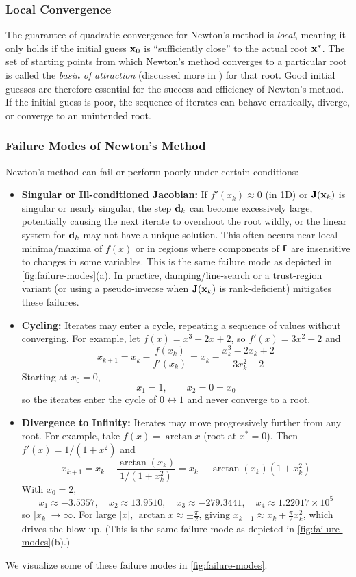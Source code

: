 \subsubsection{Local Convergence}
The guarantee of quadratic convergence for Newton's method is \textit{local}, meaning it only holds if the initial guess $\mathbf{x}_0$ is ``sufficiently close'' to the actual root $\mathbf{x}^*$. The set of starting points from which Newton's method converges to a particular root is called the \textit{basin of attraction} (discussed more in ) for that root. Good initial guesses are therefore essential for the success and efficiency of Newton's method. If the initial guess is poor, the sequence of iterates can behave erratically, diverge, or converge to an unintended root.


\subsubsection{Failure Modes of Newton's Method}
Newton's method can fail or perform poorly under certain conditions:
\begin{itemize}
    \item \textbf{Singular or Ill-conditioned Jacobian:} If $f'(x_k) \approx 0$ (in 1D) or $\mathbf{J}(\mathbf{x}_k)$ is singular or nearly singular, the step $\mathbf{d}_k$ can become excessively large, potentially causing the next iterate to overshoot the root wildly, or the linear system for $\mathbf{d}_k$ may not have a unique solution. This often occurs near local minima/maxima of $f(x)$ or in regions where components of $\mathbf{f}$ are insensitive to changes in some variables. This is the same failure mode as depicted in \autoref{fig:failure-modes}(a). In practice, damping/line-search or a trust-region variant (or using a pseudo-inverse when $\mathbf{J}(\mathbf{x}_k)$ is rank-deficient) mitigates these failures.

    \item \textbf{Cycling:} Iterates may enter a cycle, repeating a sequence of values without converging. For example, let $f(x)=x^3-2x+2$, so $f'(x)=3x^2-2$ and
    \[
    x_{k+1} = x_k-\frac{f(x_k)}{f'(x_k)} = x_k-\frac{x_k^3-2x_k+2}{3x_k^2-2}
    \]
    Starting at $x_0=0$,
    \[
    x_1=1,\qquad x_2 = 0 = x_0
    \]
    so the iterates enter the cycle of $0 \leftrightarrow 1$ and never converge to a root.
    
    \item \textbf{Divergence to Infinity:} Iterates may move progressively further from any root. For example, take $f(x)=\arctan x$ (root at $x^*=0$). Then $f'(x)=1/(1+x^2)$ and
    \[
    x_{k+1} = x_k - \frac{\arctan(x_k)}{1/(1+x_k^2)} = x_k - \arctan(x_k)(1+x_k^2)
    \]
    With $x_0=2$,
    \[
    x_1\approx -3.5357,\quad x_2\approx 13.9510,\quad x_3\approx -279.3441,\quad x_4\approx 1.22017\times 10^{5}
    \]
    so $|x_k|\to\infty$. For large $|x|$, $\arctan x\approx \pm\frac{\pi}{2}$, giving $x_{k+1}\approx x_k\mp\frac{\pi}{2}x_k^2$, which drives the blow-up. (This is the same failure mode as depicted in \autoref{fig:failure-modes}(b).)
\end{itemize}
We visualize some of these failure modes in \autoref{fig:failure-modes}.

